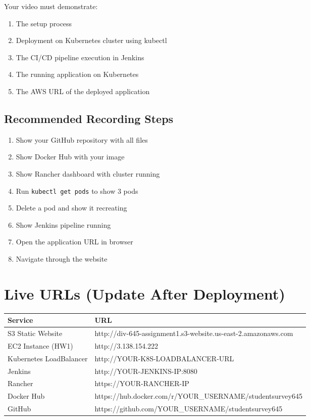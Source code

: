 \documentclass[12pt,a4paper]{article}
\begin{document}
Your video must demonstrate:

\begin{enumerate}
    \item The setup process
    \item Deployment on Kubernetes cluster using kubectl
    \item The CI/CD pipeline execution in Jenkins
    \item The running application on Kubernetes
    \item The AWS URL of the deployed application
\end{enumerate}

\subsection{Recommended Recording Steps}

\begin{enumerate}
    \item Show your GitHub repository with all files
    \item Show Docker Hub with your image
    \item Show Rancher dashboard with cluster running
    \item Run \texttt{kubectl get pods} to show 3 pods
    \item Delete a pod and show it recreating
    \item Show Jenkins pipeline running
    \item Open the application URL in browser
    \item Navigate through the website
\end{enumerate}

\newpage

\section{Live URLs (Update After Deployment)}

\begin{center}
\begin{tabular}{|l|l|}
\hline
\textbf{Service} & \textbf{URL} \\
\hline
S3 Static Website & http://div-645-assignment1.s3-website.us-east-2.amazonaws.com \\
EC2 Instance (HW1) & http://3.138.154.222 \\
Kubernetes LoadBalancer & http://YOUR-K8S-LOADBALANCER-URL \\
Jenkins & http://YOUR-JENKINS-IP:8080 \\
Rancher & https://YOUR-RANCHER-IP \\
Docker Hub & https://hub.docker.com/r/YOUR\_USERNAME/studentsurvey645 \\
GitHub & https://github.com/YOUR\_USERNAME/studentsurvey645 \\
\hline
\end{tabular}
\end{center}
\end{document}
